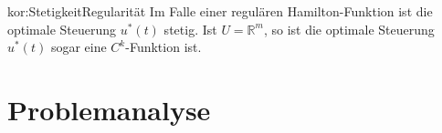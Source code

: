 \begin{korollar}[]{kor:StetigkeitRegularität}
Im Falle einer regulären Hamilton-Funktion ist die optimale Steuerung $u^*(t)$ stetig. Ist $U=\mathbb{R}^m$, so ist die optimale Steuerung $u^*(t)$ sogar eine $C^k$-Funktion ist.
\end{korollar}


\section{Problemanalyse} \label{sec:Problemanalyse}

